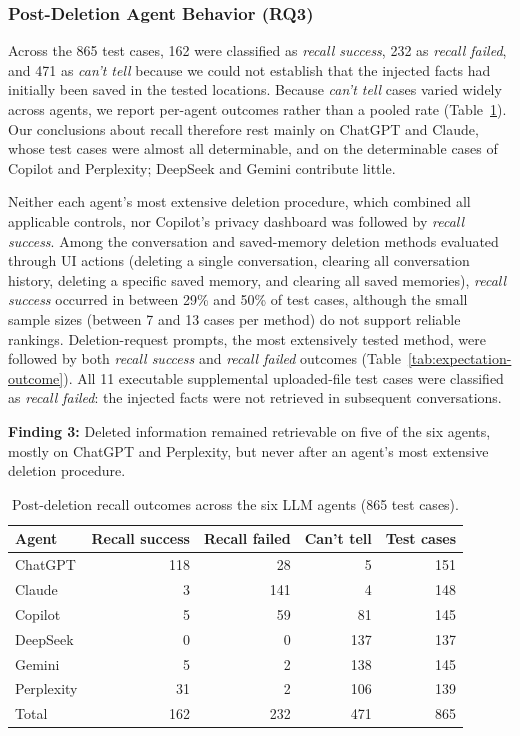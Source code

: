 \subsubsection{Post-Deletion Agent Behavior (RQ3)}
\label{sec:rq3}

Across the 865 test cases, 162 were classified as \textit{recall success}, 232 as \textit{recall failed}, and 471 as \textit{can't tell} because we could not establish that the injected facts had initially been saved in the tested locations.
%
Because \textit{can't tell} cases varied widely across agents, we report per-agent outcomes rather than a pooled rate (Table~\ref{tab:outcomes-agent}).
%
Our conclusions about recall therefore rest mainly on ChatGPT and Claude, whose test cases were almost all determinable, and on the determinable cases of Copilot and Perplexity; DeepSeek and Gemini contribute little.

%
Neither each agent's most extensive deletion procedure, which combined all applicable controls, nor Copilot's privacy dashboard was followed by \textit{recall success}.
%
Among the conversation and saved-memory deletion methods evaluated through UI actions (deleting a single conversation, clearing all conversation history, deleting a specific saved memory, and clearing all saved memories), \textit{recall success} occurred in between 29\% and 50\% of test cases, although the small sample sizes (between 7 and 13 cases per method) do not support reliable rankings.
%
Deletion-request prompts, the most extensively tested method, were followed by both \textit{recall success} and \textit{recall failed} outcomes (Table~\ref{tab:expectation-outcome}).
%
All 11 executable supplemental uploaded-file test cases were classified as \textit{recall failed}: the injected facts were not retrieved in subsequent conversations.

\begin{takeawaybox}
\textbf{Finding 3:} Deleted information remained retrievable on five of the six agents, mostly on ChatGPT and Perplexity, but never after an agent's most extensive deletion procedure.
\end{takeawaybox}

\begin{table}[!t]
\centering
\caption{Post-deletion recall outcomes across the six LLM agents (865 test cases).}
\label{tab:outcomes-agent}
\footnotesize
\begin{tabular}{@{}lrrrr@{}}
\toprule
Agent & Recall success & Recall failed & Can't tell & Test cases \\
\midrule
ChatGPT & 118 & 28 & 5 & 151 \\
Claude & 3 & 141 & 4 & 148 \\
Copilot & 5 & 59 & 81 & 145 \\
DeepSeek & 0 & 0 & 137 & 137 \\
Gemini & 5 & 2 & 138 & 145 \\
Perplexity & 31 & 2 & 106 & 139 \\
\midrule
Total & 162 & 232 & 471 & 865 \\
\bottomrule
\end{tabular}
\end{table}

